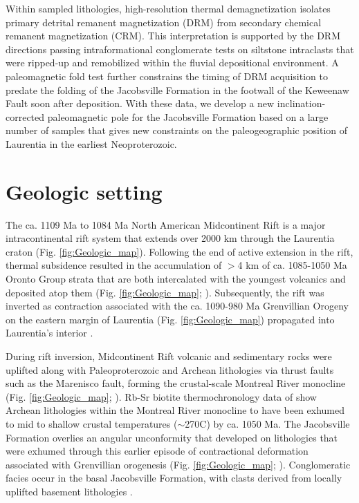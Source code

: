 \documentclass[draft]{agujournal2019}
\begin{document}
Within sampled lithologies, high-resolution thermal demagnetization isolates primary detrital remanent magnetization (DRM) from secondary chemical remanent magnetization (CRM). This interpretation is supported by the DRM directions passing intraformational conglomerate tests on siltstone intraclasts that were ripped-up and remobilized within the fluvial depositional environment. A paleomagnetic fold test further constrains the timing of DRM acquisition to predate the folding of the Jacobsville Formation in the footwall of the Keweenaw Fault soon after deposition. With these data, we develop a new inclination-corrected paleomagnetic pole for the Jacobsville Formation based on a large number of samples that gives new constraints on the paleogeographic position of Laurentia in the earliest Neoproterozoic.

\section*{Geologic setting}

The ca. 1109 Ma to 1084 Ma North American Midcontinent Rift is a major intracontinental rift system that extends over 2000 km through the Laurentia craton (Fig. \ref{fig:Geologic_map}). Following the end of active extension in the rift, thermal subsidence resulted in the accumulation of $>$4 km of ca. 1085-1050 Ma Oronto Group strata that are both intercalated with the youngest volcanics and deposited atop them (Fig. \ref{fig:Geologic_map}; ). Subsequently, the rift was inverted as contraction associated with the ca. 1090-980 Ma Grenvillian Orogeny on the eastern margin of Laurentia (Fig. \ref{fig:Geologic_map}) propagated into Laurentia's interior \cite{Cannon1993a, Cannon1994a, Hodgin2022a, Swanson-Hysell2023a}. 

During rift inversion, Midcontinent Rift volcanic and sedimentary rocks were uplifted along with Paleoproterozoic and Archean lithologies via thrust faults such as the Marenisco fault, forming the crustal-scale Montreal River monocline (Fig. \ref{fig:Geologic_map}; ). Rb-Sr biotite thermochronology data of  show Archean lithologies within the Montreal River monocline to have been exhumed to mid to shallow crustal temperatures ($\sim$270\textdegree C) by ca. 1050 Ma. The Jacobsville Formation overlies an angular unconformity that developed on lithologies that were exhumed through this earlier episode of contractional deformation associated with Grenvillian orogenesis (Fig. \ref{fig:Geologic_map}; ). Conglomeratic facies occur in the basal Jacobsville Formation, with clasts derived from locally uplifted basement lithologies \cite{Irving1885a, Hamblin1958a, Kalliokoski1982a}.
\end{document}
